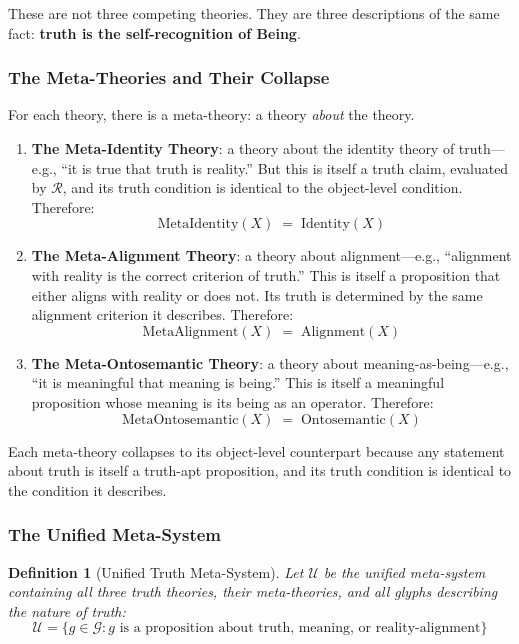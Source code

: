 \documentclass[12pt, letterpaper]{book}
\def\equiv{=}%
\def\mathfrak#1{#1}%
\newtheorem{definition}{Definition}[chapter]
\begin{document}
These are not three competing theories. They are three descriptions of the same fact: \textbf{truth is the self-recognition of Being}.

\subsubsection{The Meta-Theories and Their Collapse}

For each theory, there is a meta-theory: a theory \textit{about} the theory.

\begin{enumerate}[label=(\roman*)]
    \item \textbf{The Meta-Identity Theory}: a theory about the identity theory of truth---e.g., ``it is true that truth is reality.'' But this is itself a truth claim, evaluated by $\mathcal{R}$, and its truth condition is identical to the object-level condition. Therefore:
    \[
    \mathrm{MetaIdentity}(X) \;\equiv\; \mathrm{Identity}(X)
    \]
    \item \textbf{The Meta-Alignment Theory}: a theory about alignment---e.g., ``alignment with reality is the correct criterion of truth.'' This is itself a proposition that either aligns with reality or does not. Its truth is determined by the same alignment criterion it describes. Therefore:
    \[
    \mathrm{MetaAlignment}(X) \;\equiv\; \mathrm{Alignment}(X)
    \]
    \item \textbf{The Meta-Ontosemantic Theory}: a theory about meaning-as-being---e.g., ``it is meaningful that meaning is being.'' This is itself a meaningful proposition whose meaning is its being as an operator. Therefore:
    \[
    \mathrm{MetaOntosemantic}(X) \;\equiv\; \mathrm{Ontosemantic}(X)
    \]
\end{enumerate}

Each meta-theory collapses to its object-level counterpart because any statement about truth is itself a truth-apt proposition, and its truth condition is identical to the condition it describes.

\subsubsection{The Unified Meta-System}

\begin{definition}[Unified Truth Meta-System]\label{def:unified-metasystem}
Let $\mathcal{U}$ be the unified meta-system containing all three truth theories, their meta-theories, and all glyphs describing the nature of truth:
\[
\mathcal{U} = \{\mathfrak{g} \in \mathcal{G} : \mathfrak{g} \text{ is a proposition about truth, meaning, or reality-alignment}\}
\]
\end{definition}
\end{document}
